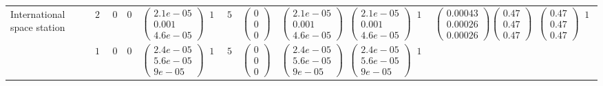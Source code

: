\begin{table*}[t]
\begin{tabular}{|p{1.5cm}|c|c|c|c|c|c|c|c|c|c|c|c|c|c|}
\multirow{2}{*}{\parbox{1.5cm}{International space station}} 
& $25$ 
& $0$ & $0$ 
&$\begin{pmatrix}2.1e-05  \\ 0.001  \\ 4.6e-05\end{pmatrix}$ & $15 $ & {$5$} 
&$\begin{pmatrix}0  \\ 0  \\ 0 \end{pmatrix}$ &$\begin{pmatrix}2.1e-05  \\ 0.001  \\ 4.6e-05 \end{pmatrix}$ &$\begin{pmatrix}2.1e-05  \\ 0.001  \\ 4.6e-05 \end{pmatrix}$ & $11$ 
&$\begin{pmatrix}0.00043  \\ 0.00026  \\ 0.00026 \end{pmatrix}$ &$\begin{pmatrix}0.47  \\ 0.47  \\ 0.47 \end{pmatrix}$ &$\begin{pmatrix}0.47  \\ 0.47  \\ 0.47 \end{pmatrix}$ & $11$  \\ 
\cline{2-15} 
& $10$ 
& $0$ & $0$ 
&$\begin{pmatrix}2.4e-05  \\ 5.6e-05  \\ 9e-05\end{pmatrix}$ & $14 $ & {$5$} 
&$\begin{pmatrix}0  \\ 0  \\ 0 \end{pmatrix}$ &$\begin{pmatrix}2.4e-05  \\ 5.6e-05  \\ 9e-05 \end{pmatrix}$ &$\begin{pmatrix}2.4e-05  \\ 5.6e-05  \\ 9e-05 \end{pmatrix}$ & $11$ 

\end{tabular}
\end{table*}
